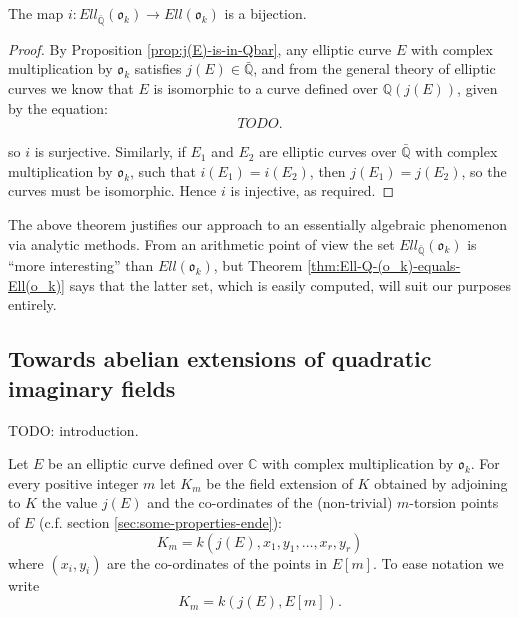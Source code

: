 \begin{thm}
  \label{thm:Ell-Q-(o_k)-equals-Ell(o_k)}
  The map $i :
Ell_{\bar{\mathbb{Q}}}(\mathfrak{o}_{k}) \rightarrow Ell(\mathfrak{o}_{k})$ is a bijection.
\end{thm}
\begin{proof}
  By Proposition \ref{prop:j(E)-is-in-Qbar}, any elliptic curve $E$ with complex
  multiplication by $\mathfrak{o}_{k}$ satisfies $j(E) \in \bar{\mathbb{Q}}$, and
  from the general theory of elliptic curves we know that $E$ is isomorphic to a
  curve defined over $\mathbb{Q}(j(E))$, given by the equation:
  \begin{equation}
    \label{E-defined-over-k(j(E))}
    TODO.
  \end{equation}
  
  so $i$ is surjective.  Similarly, if $E_{1}$ and $E_{2}$ are elliptic curves over
  $\bar{\mathbb{Q}}$ with complex multiplication by $\mathfrak{o}_{k}$, such that
  $i(E_{1}) = i(E_{2})$, then $j(E_{1}) = j(E_{2})$, so the curves must be
  isomorphic.  Hence $i$ is injective, as required.
\end{proof}
The above theorem justifies our approach to an essentially algebraic phenomenon via
analytic methods.  From an arithmetic point of view the set
$Ell_{\bar{\mathbb{Q}}}(\mathfrak{o}_{k})$ is ``more interesting'' than
$Ell(\mathfrak{o}_{k})$, but Theorem \ref{thm:Ell-Q-(o_k)-equals-Ell(o_k)} says that
the latter set, which is easily computed, will suit our purposes entirely.

\subsection{Towards abelian extensions of quadratic imaginary fields}
\label{sec:towards-abel-extens}

TODO: introduction.

Let $E$ be an elliptic curve defined over $\mathbb{C}$ with complex multiplication by
$\mathfrak{o}_{k}$.  For every positive integer $m$ let $K_{m}$ be the field
extension of $K$ obtained by adjoining to $K$ the value $j(E)$ and the co-ordinates
of the (non-trivial) $m$-torsion points of $E$ (c.f. section
\ref{sec:some-properties-ende}):
\begin{equation}
  \label{eq:defn-of-K_m}
  K_{m} = k(j(E),x_{1},y_{1},\ldots,x_{r},y_{r})
\end{equation}
where $(x_{i},y_{i})$ are the co-ordinates of the points in $E[m]$.  To ease notation
we write
\begin{equation*}
  K_{m} = k(j(E),E[m]).
\end{equation*}

